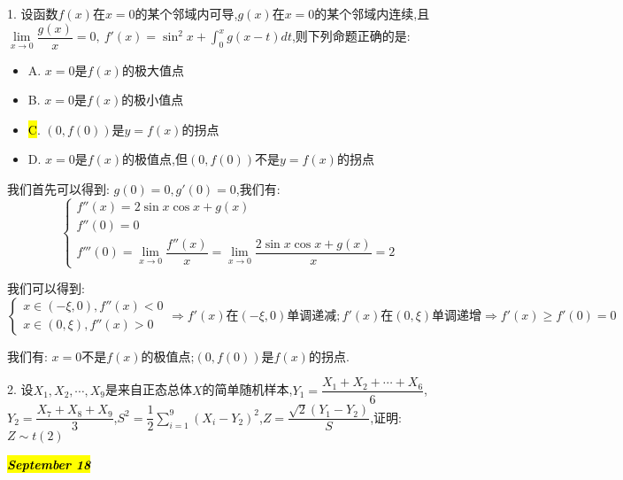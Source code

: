 1. 设函数$f(x)$在$x=0$的某个邻域内可导,$g(x)$在$x=0$的某个邻域内连续,且$\lim\limits_{x\rightarrow 0}\dfrac{g(x)}{x}=0,\ f'(x)=\sin^2 x+\int_{0}^{x}g(x-t)dt$,则下列命题正确的是:  
\begin{itemize}
	\item A. $x=0$是$f(x)$的极大值点
	\item B. $x=0$是$f(x)$的极小值点
	\item \hl{C}. $(0,f(0))$是$y=f(x)$的拐点
	\item D. $x=0$是$f(x)$的极值点,但$(0,f(0))$不是$y=f(x)$的拐点
\end{itemize}
\begin{solution}

	我们首先可以得到:  $g(0)=0,g'(0)=0$,我们有:  
	$$\left\lbrace
	\begin{array}{l}
		f''(x)=2\sin x\cos x+g(x)\\
		f''(0)=0\\
		f'''(0)=\lim\limits_{x\rightarrow 0}\dfrac{f''(x)}{x}=\lim\limits_{x\rightarrow 0}\dfrac{2\sin x\cos x+g(x)}{x}=2
	\end{array}
	\right. $$
	
	我们可以得到:  $$\left\lbrace
	\begin{array}{l}
		x\in(-\xi,0),f''(x)<0\\
		x\in(0,\xi),f''(x)>0
	\end{array}
	\right. \Rightarrow f'(x)\text{在}(-\xi,0)\text{单调递减};f'(x)\text{在}(0,\xi)\text{单调递增}\Rightarrow f'(x)\geq f'(0)=0$$
	
	我们有:  $x=0$不是$f(x)$的极值点;$(0,f(0))$是$f(x)$的拐点.
\end{solution}

2. 设$X_{1},X_{2},\cdots,X_{9}$是来自正态总体$X$的简单随机样本,$Y_{1}=\dfrac{X_{1}+X_{2}+\cdots+X_{6}}{6}$,$Y_{2}=\dfrac{X_{7}+X_{8}+X_{9}}{3}$,$S^2=\dfrac{1}{2}\sum\limits_{i=1}^{9}(X_{i}-Y_{2})^2$,$Z=\dfrac{\sqrt{2}(Y_{1}-Y_{2})}{S}$,证明:  $Z\sim t(2)$
\begin{solution}
	
\end{solution}

\hl{\textbf{\textit{September 18}}}

